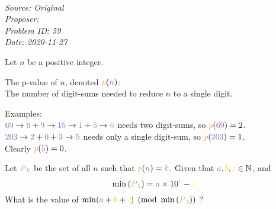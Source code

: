 \SSbreak\\
\emph{Source: Original}\\
\emph{Proposer: \Pkee}\\
\emph{Problem ID: 59}\\
\emph{Date: 2020-11-27}\\
\SSbreak

\begin{mdframed}[backgroundcolor=pagegray,rightline=false,leftline=false, topline=false, bottomline=false]
    \color{white}
    Let \textcolor{qpurple}{$n$} be a positive integer.
    \par
    The \textcolor{qlorange}{p-value} of \textcolor{qpurple}{$n$}, denoted $\persistk{n}$: \\

    The number of digit-sums needed to reduce \textcolor{qpurple}{$n$} to a single digit.
    \par
    Examples: \\

    $\textcolor{qpurple}{69} \rightarrow \textcolor{qpurple}{6} + \textcolor{qpurple}{9} \rightarrow \textcolor{qblue}{15} \rightarrow \textcolor{qblue}{1} + \textcolor{qblue}{5} \rightarrow \textcolor{qgreen}{6}$ needs two digit-sums, so $\persistk{69} = 2$. \\
    $\textcolor{qpurple}{203} \rightarrow \textcolor{qpurple}{2} + \textcolor{qpurple}{0} +  \textcolor{qpurple}{3} \rightarrow \textcolor{qblue}{5}$ needs only a single digit-sum, so $\persistk{203} = 1$. \\
    Clearly $\persistk{5} = 0$.\\

    \par
    Let $\persistsetk{k}$ be the set of all \textcolor{qpurple}{$n$} such that $\persistk{n} = \textcolor{qlblue}{k}$. Given that $\textcolor{qred}{a}, \textcolor{qorange}{b}, \textcolor{qyellow}{c} \in \mathbb{N}$, and
    \begin{equation*}
        \min{(\persistsetk{5})} = \textcolor{qred}{a}\times 10^{\textcolor{qorange}{b}} - \textcolor{qyellow}{c}
    \end{equation*}
    What is the value of $\min(\textcolor{qred}{a} + \textcolor{qorange}{b} + \textcolor{qyellow}{c}) \pmod{\min{(\persistsetk{3})}}$ ?
\end{mdframed}
\color{black}
\bigskip

\begin{solution}
    
\end{solution}